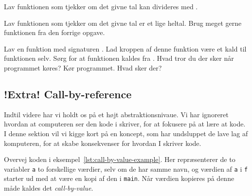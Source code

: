         \begin{exercise}
            Lav funktionen 
            som tjekker om det givne tal  kan
            divideres med .
        \end{exercise}

        \begin{exercise}
            Lav funktionen  som
            tjekker om det givne tal  er et lige
            heltal.  Brug meget gerne funktionen
             fra den forrige opgave.
        \end{exercise}

        \begin{exercise}
            Lav en funktion med signaturen . Lad
            kroppen af denne funktion være et kald til funktionen
            selv. Sørg for at funktionen kaldes fra .
            Hvad tror du der sker når programmet køres? Kør
            programmet. Hvad sker der?
        \end{exercise}

    \subsection{!Extra! Call-by-reference}



        Indtil videre har vi holdt os på et højt abstraktionsnivaue.
        Vi har ignoreret hvordan at computeren ser den kode i skriver,
        for at fokusere på at lære at kode. I denne sektion vil vi
        kigge kort på en koncept, som har undsluppet de lave lag af
        komputeren, for at skabe konsekvenser for hvordan I skriver
        kode.

        Overvej koden i eksempel~\ref{lst:call-by-value-example}. Her
        repræsenterer de to variabler \texttt{a} to forskellige værdier,
        selv om de har samme navn, og værdien af \texttt{a} i \texttt{f}
        starter ud med at være en kopi af den i \texttt{main}. Når
        værdien kopieres på denne måde kaldes det
        \emph{call-by-value}.

